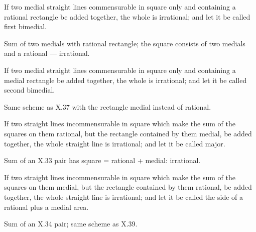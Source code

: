 \begin{claim}
\label{prop:X.37}
If two medial straight lines commensurable in square only and
containing a rational rectangle be added together, the whole is
irrational; and let it be called first bimedial.
\end{claim}
\begin{evidence}[Proof of X.37]
\label{ev:X.37}
Sum of two medials with rational rectangle; the square consists of
two medials and a rational --- irrational.
\end{evidence}

\begin{claim}
\label{prop:X.38}
If two medial straight lines commensurable in square only and
containing a medial rectangle be added together, the whole is
irrational; and let it be called second bimedial.
\end{claim}
\begin{evidence}[Proof of X.38]
\label{ev:X.38}
Same scheme as X.37 with the rectangle medial instead of rational.
\end{evidence}

\begin{claim}
\label{prop:X.39}
If two straight lines incommensurable in square which make the sum
of the squares on them rational, but the rectangle contained by them
medial, be added together, the whole straight line is irrational;
and let it be called major.
\end{claim}
\begin{evidence}[Proof of X.39]
\label{ev:X.39}
Sum of an X.33 pair has square = rational + medial: irrational.
\end{evidence}

\begin{claim}
\label{prop:X.40}
If two straight lines incommensurable in square which make the sum
of the squares on them medial, but the rectangle contained by them
rational, be added together, the whole straight line is irrational;
and let it be called the side of a rational plus a medial area.
\end{claim}
\begin{evidence}[Proof of X.40]
\label{ev:X.40}
Sum of an X.34 pair; same scheme as X.39.
\end{evidence}

